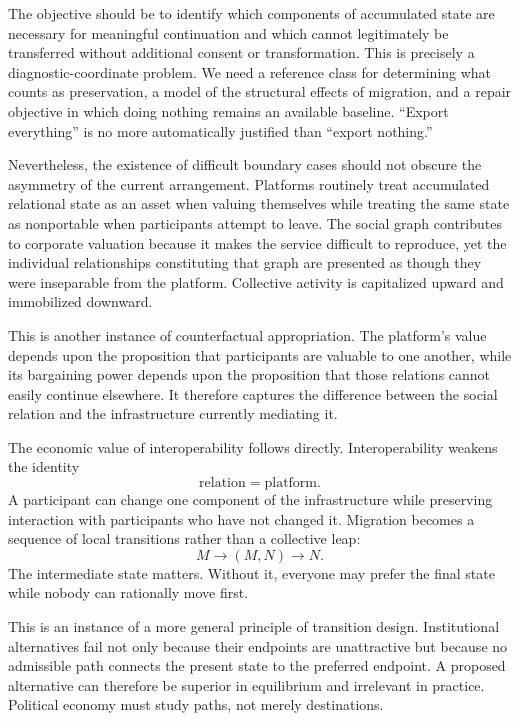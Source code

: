 \documentclass[11pt]{article}
\begin{document}
The objective should be to identify which components of accumulated state are necessary for meaningful continuation and which cannot legitimately be transferred without additional consent or transformation. This is precisely a diagnostic-coordinate problem. We need a reference class for determining what counts as preservation, a model of the structural effects of migration, and a repair objective in which doing nothing remains an available baseline. ``Export everything'' is no more automatically justified than ``export nothing.''

Nevertheless, the existence of difficult boundary cases should not obscure the asymmetry of the current arrangement. Platforms routinely treat accumulated relational state as an asset when valuing themselves while treating the same state as nonportable when participants attempt to leave. The social graph contributes to corporate valuation because it makes the service difficult to reproduce, yet the individual relationships constituting that graph are presented as though they were inseparable from the platform. Collective activity is capitalized upward and immobilized downward.

This is another instance of counterfactual appropriation. The platform's value depends upon the proposition that participants are valuable to one another, while its bargaining power depends upon the proposition that those relations cannot easily continue elsewhere. It therefore captures the difference between the social relation and the infrastructure currently mediating it.

The economic value of interoperability follows directly. Interoperability weakens the identity
\[
\text{relation}=\text{platform}.
\]
A participant can change one component of the infrastructure while preserving interaction with participants who have not changed it. Migration becomes a sequence of local transitions rather than a collective leap:
\[
M
\rightarrow
(M,N)
\rightarrow
N.
\]
The intermediate state matters. Without it, everyone may prefer the final state while nobody can rationally move first.

This is an instance of a more general principle of transition design. Institutional alternatives fail not only because their endpoints are unattractive but because no admissible path connects the present state to the preferred endpoint. A proposed alternative can therefore be superior in equilibrium and irrelevant in practice. Political economy must study paths, not merely destinations.
\end{document}
